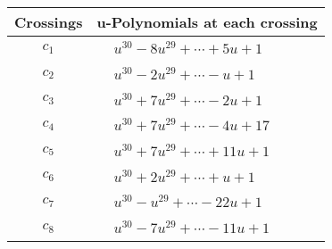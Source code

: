 \documentclass[1p]{elsarticle_modified}
\theoremstyle{definition}
\begin{document}
\begin{tabular}{m{50pt}|m{274pt}}
Crossings & \hspace{64pt}u-Polynomials at each crossing \\
\hline $$\begin{aligned}c_{1}\end{aligned}$$&$\begin{aligned}
&u^{30}-8 u^{29}+\cdots+5 u+1
\end{aligned}$\\
\hline $$\begin{aligned}c_{2}\end{aligned}$$&$\begin{aligned}
&u^{30}-2 u^{29}+\cdots- u+1
\end{aligned}$\\
\hline $$\begin{aligned}c_{3}\end{aligned}$$&$\begin{aligned}
&u^{30}+7 u^{29}+\cdots-2 u+1
\end{aligned}$\\
\hline $$\begin{aligned}c_{4}\end{aligned}$$&$\begin{aligned}
&u^{30}+7 u^{29}+\cdots-4 u+17
\end{aligned}$\\
\hline $$\begin{aligned}c_{5}\end{aligned}$$&$\begin{aligned}
&u^{30}+7 u^{29}+\cdots+11 u+1
\end{aligned}$\\
\hline $$\begin{aligned}c_{6}\end{aligned}$$&$\begin{aligned}
&u^{30}+2 u^{29}+\cdots+u+1
\end{aligned}$\\
\hline $$\begin{aligned}c_{7}\end{aligned}$$&$\begin{aligned}
&u^{30}- u^{29}+\cdots-22 u+1
\end{aligned}$\\
\hline $$\begin{aligned}c_{8}\end{aligned}$$&$\begin{aligned}
&u^{30}-7 u^{29}+\cdots-11 u+1
\end{aligned}$\\

\end{tabular}
\end{document}
